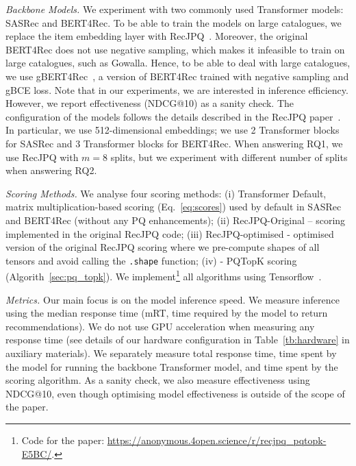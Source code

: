\documentclass[sigconf,natbib=true, review=true]{acmart} %
\newcommand{\rsasha}[1]{\textcolor[HTML]{FF0000}{#1}}
\begin{document}
\textit{Backbone Models.} We experiment with two commonly used Transformer models: SASRec and BERT4Rec. To be able to train the models on large catalogues, we replace the item embedding layer with RecJPQ~\cite{petrovRecJPQTrainingLargeCatalogue2024}. Moreover, the original BERT4Rec does not use negative sampling, which makes it infeasible to train on large catalogues, such as Gowalla. Hence, to be able to deal with large catalogues, we use gBERT4Rec~\cite{petrovGSASRecReducingOverconfidence2023}, a version of BERT4Rec trained with negative sampling and gBCE loss. Note that in our experiments, we are interested in inference efficiency. However, we report effectiveness (NDCG@10) as a sanity check. The configuration of the models follows the details described in the RecJPQ paper~\cite{petrovRecJPQTrainingLargeCatalogue2024}. In particular, we use 512-dimensional embeddings;  we use 2 Transformer blocks for SASRec and 3 Transformer blocks for BERT4Rec. When answering RQ1, we use RecJPQ with $m=8$ splits, but we experiment with different number of splits when answering RQ2. 

\textit{Scoring Methods.} We analyse four scoring methods: (i) Transformer Default,  matrix multiplication-based scoring (Eq.~\eqref{eq:scores}) used by default in SASRec and BERT4Rec \rsasha{(without any PQ enhancements)}; (ii) RecJPQ-Original -- scoring implemented in the original RecJPQ code; (iii) RecJPQ-optimised - optimised version of the original RecJPQ scoring where \rsasha{we pre-compute shapes of all tensors and avoid calling the \texttt{.shape} function}; (iv) - PQTopK scoring (Algorith~\ref{sec:pq_topk}). We implement\footnote{\rsasha{Code for the paper: \href{https://anonymous.4open.science/r/recjpq\_pqtopk-E5BC/}{https://anonymous.4open.science/r/recjpq\_pqtopk-E5BC/}}.} all algorithms using Tensorflow~\cite{abadiTensorFlowSystemLargeScale2016}. 

\textit{Metrics.} Our main focus is on the model inference speed. We measure inference using the median response time (mRT, time required by the model to return recommendations). We do not use GPU acceleration when measuring any response time \rsasha{(see details of our hardware configuration in Table~\ref{tb:hardware} in auxiliary materials)}.  We separately measure total response time, time spent by the model for running the backbone Transformer model, and time spent by the scoring algorithm. As a sanity check, we also measure effectiveness using NDCG@10, even though optimising model effectiveness is outside of the scope of the paper. 
\end{document}
